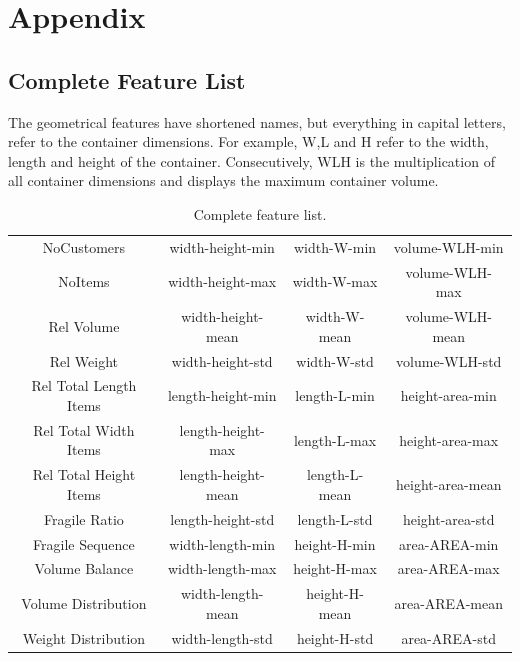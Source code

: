 \appendix
\chapter{Appendix}
\section{Complete Feature List}

The geometrical features have shortened names, but everything in capital letters, refer to the container
dimensions. For example, W,L and H refer to the width, length and height of the container. Consecutively,
WLH is the multiplication of all container dimensions and displays the maximum container volume.

\begin{table}[ht]
	\centering
	\small
	\renewcommand{\arraystretch}{1.3}
	\begin{tabular}{@{}cccc@{}}
		NoCustomers            & width-height-min   & width-W-min   & volume-WLH-min   \\
		NoItems                & width-height-max   & width-W-max   & volume-WLH-max   \\
		Rel Volume             & width-height-mean  & width-W-mean  & volume-WLH-mean  \\
		Rel Weight             & width-height-std   & width-W-std   & volume-WLH-std   \\
		Rel Total Length Items & length-height-min  & length-L-min  & height-area-min  \\
		Rel Total Width Items  & length-height-max  & length-L-max  & height-area-max  \\
		Rel Total Height Items & length-height-mean & length-L-mean & height-area-mean \\
		Fragile Ratio          & length-height-std  & length-L-std  & height-area-std  \\
		Fragile Sequence       & width-length-min   & height-H-min  & area-AREA-min    \\
		Volume Balance         & width-length-max   & height-H-max  & area-AREA-max    \\
		Volume Distribution    & width-length-mean  & height-H-mean & area-AREA-mean   \\
		Weight Distribution    & width-length-std   & height-H-std  & area-AREA-std    \\
	\end{tabular}
	\caption{Complete feature list.}
	\label{tab:complete_features_list}
\end{table}

